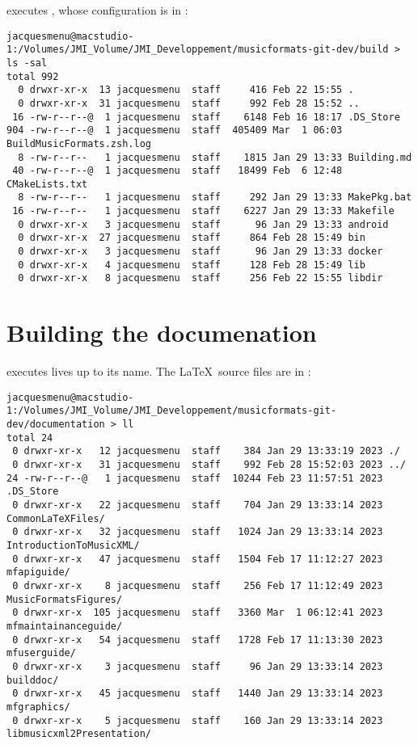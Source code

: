  executes \cmake, whose configuration is in \buildFolder:
\begin{lstlisting}[language=Terminal]
jacquesmenu@macstudio-1:/Volumes/JMI_Volume/JMI_Developpement/musicformats-git-dev/build > ls -sal
total 992
  0 drwxr-xr-x  13 jacquesmenu  staff     416 Feb 22 15:55 .
  0 drwxr-xr-x  31 jacquesmenu  staff     992 Feb 28 15:52 ..
 16 -rw-r--r--@  1 jacquesmenu  staff    6148 Feb 16 18:17 .DS_Store
904 -rw-r--r--@  1 jacquesmenu  staff  405409 Mar  1 06:03 BuildMusicFormats.zsh.log
  8 -rw-r--r--   1 jacquesmenu  staff    1815 Jan 29 13:33 Building.md
 40 -rw-r--r--@  1 jacquesmenu  staff   18499 Feb  6 12:48 CMakeLists.txt
  8 -rw-r--r--   1 jacquesmenu  staff     292 Jan 29 13:33 MakePkg.bat
 16 -rw-r--r--   1 jacquesmenu  staff    6227 Jan 29 13:33 Makefile
  0 drwxr-xr-x   3 jacquesmenu  staff      96 Jan 29 13:33 android
  0 drwxr-xr-x  27 jacquesmenu  staff     864 Feb 28 15:49 bin
  0 drwxr-xr-x   3 jacquesmenu  staff      96 Jan 29 13:33 docker
  0 drwxr-xr-x   4 jacquesmenu  staff     128 Feb 28 15:49 lib
  0 drwxr-xr-x   8 jacquesmenu  staff     256 Feb 22 15:55 libdir
\end{lstlisting}


\section{Building the documenation}

 executes lives up to its name. The \LaTeX\ source files are in \docFolder:
\begin{lstlisting}[language=Terminal]
jacquesmenu@macstudio-1:/Volumes/JMI_Volume/JMI_Developpement/musicformats-git-dev/documentation > ll
total 24
 0 drwxr-xr-x   12 jacquesmenu  staff    384 Jan 29 13:33:19 2023 ./
 0 drwxr-xr-x   31 jacquesmenu  staff    992 Feb 28 15:52:03 2023 ../
24 -rw-r--r--@   1 jacquesmenu  staff  10244 Feb 23 11:57:51 2023 .DS_Store
 0 drwxr-xr-x   22 jacquesmenu  staff    704 Jan 29 13:33:14 2023 CommonLaTeXFiles/
 0 drwxr-xr-x   32 jacquesmenu  staff   1024 Jan 29 13:33:14 2023 IntroductionToMusicXML/
 0 drwxr-xr-x   47 jacquesmenu  staff   1504 Feb 17 11:12:27 2023 mfapiguide/
 0 drwxr-xr-x    8 jacquesmenu  staff    256 Feb 17 11:12:49 2023 MusicFormatsFigures/
 0 drwxr-xr-x  105 jacquesmenu  staff   3360 Mar  1 06:12:41 2023 mfmaintainanceguide/
 0 drwxr-xr-x   54 jacquesmenu  staff   1728 Feb 17 11:13:30 2023 mfuserguide/
 0 drwxr-xr-x    3 jacquesmenu  staff     96 Jan 29 13:33:14 2023 builddoc/
 0 drwxr-xr-x   45 jacquesmenu  staff   1440 Jan 29 13:33:14 2023 mfgraphics/
 0 drwxr-xr-x    5 jacquesmenu  staff    160 Jan 29 13:33:14 2023 libmusicxml2Presentation/
\end{lstlisting}

